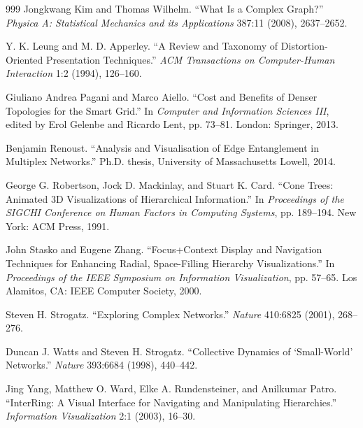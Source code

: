 \documentclass[12pt,a4paper, openany]{book}
\begin{document}
\begin{thebibliography}{999}
Jongkwang Kim and Thomas Wilhelm. “What Is a Complex Graph?” \textit{Physica A: Statistical Mechanics and its Applications} 387:11 (2008), 2637--2652.

Y. K. Leung and M. D. Apperley. “A Review and Taxonomy of Distortion-Oriented Presentation Techniques.” \textit{ACM Transactions on Computer-Human Interaction} 1:2 (1994), 126--160.

Giuliano Andrea Pagani and Marco Aiello. “Cost and Benefits of Denser Topologies for the Smart Grid.” In \textit{Computer and Information Sciences III}, edited by Erol Gelenbe and Ricardo Lent, pp. 73--81. London: Springer, 2013.

Benjamin Renoust. “Analysis and Visualisation of Edge Entanglement in Multiplex Networks.” Ph.D. thesis, University of Massachusetts Lowell, 2014.

George G. Robertson, Jock D. Mackinlay, and Stuart K. Card. “Cone Trees: Animated 3D Visualizations of Hierarchical Information.” In \textit{Proceedings of the SIGCHI Conference on Human Factors in Computing Systems}, pp. 189--194. New York: ACM Press, 1991.

John Stasko and Eugene Zhang. “Focus+Context Display and Navigation Techniques for Enhancing Radial, Space-Filling Hierarchy Visualizations.” In \textit{Proceedings of the IEEE Symposium on Information Visualization}, pp. 57--65. Los Alamitos, CA: IEEE Computer Society, 2000.

Steven H. Strogatz. “Exploring Complex Networks.” \textit{Nature} 410:6825 (2001), 268--276.

Duncan J. Watts and Steven H. Strogatz. “Collective Dynamics of ‘Small-World’ Networks.” \textit{Nature} 393:6684 (1998), 440--442.

Jing Yang, Matthew O. Ward, Elke A. Rundensteiner, and Anilkumar Patro. “InterRing: A Visual Interface for Navigating and Manipulating Hierarchies.” \textit{Information Visualization} 2:1 (2003), 16--30.

\end{thebibliography}
\end{document}
